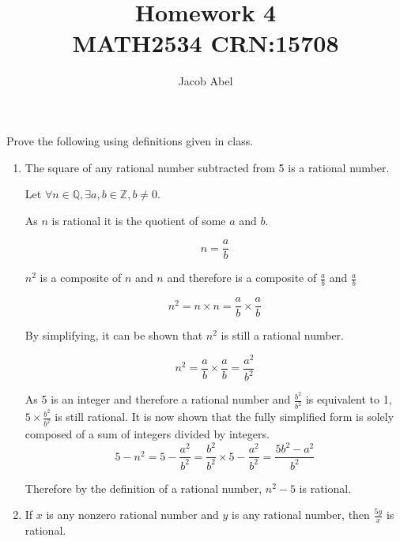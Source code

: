 \documentclass[12pt,letterpaper,titlepage]{article}
\author{Jacob Abel}
\title{	Homework 4
	\\\large MATH2534 CRN:15708
}
\begin{document}
\maketitle
\begin{raggedright}
Prove the following using definitions given in class.
\begin{enumerate}


\item The square of any rational number subtracted from 5 is a rational number.

Let $\forall n\in \mathbb{Q}, \exists a, b \in \mathbb{Z}, b \neq 0$.

As $n$ is rational it is the quotient of some $a$ and $b$.

\begin{equation}
n  = \frac{a}{b}
\end{equation}

$n^2$ is a composite of $n$ and $n$ and therefore is a composite of $\frac{a}{b}$ and $\frac{a}{b}$

\begin{equation}
n^2 = n \times n = \frac{a}{b} \times \frac{a}{b}
\end{equation}

By simplifying, it can be shown that $n^2$ is still a rational number.

\begin{equation}
n^2 = \frac{a}{b} \times \frac{a}{b} = \frac{a^2}{b^2}
\end{equation}

As 5 is an integer and therefore a rational number and $\frac{b^2}{b^2}$ is equivalent to 1, $5\times \frac{b^2}{b^2}$ is still rational. It is now shown that the fully simplified form is solely composed of a sum of integers divided by integers. 
\begin{equation}
5 - n^2 = 5 - \frac{a^2}{b^2} 
        = \frac{b^2}{b^2} \times 5 - \frac{a^2}{b^2} 
        = \frac{5b^2-a^2}{b^2}
\end{equation}

Therefore by the definition of a rational number, $n^2-5$ is rational.

\pagebreak


\item If $x$ is any nonzero rational number and $y$ is any rational number, then $\frac{5y}{x}$ is rational.


\end{enumerate}
\end{raggedright}
\end{document}
